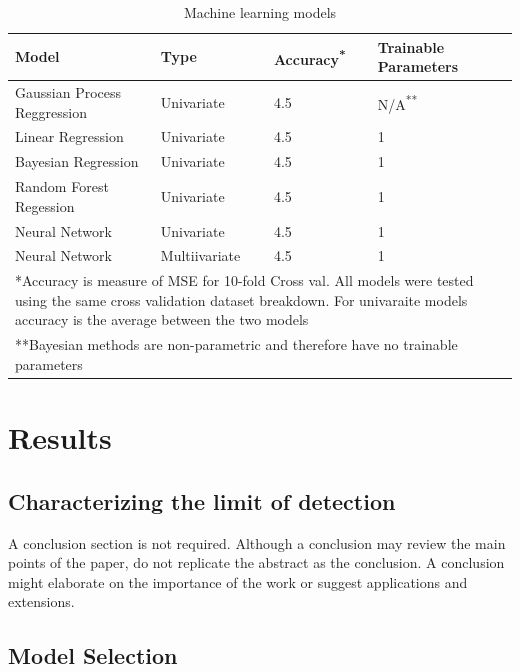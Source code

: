 \documentclass[journal,twoside,web]{ieeecolor}
\begin{document}
\begin{table}
\caption{Machine learning models}
\label{table}
\setlength{\tabcolsep}{3pt}
\begin{tabular}{|p{100pt}|p{45pt}|p{35pt}|p{50pt}|}
\hline
Model & 
Type& 
Accuracy\textsuperscript{*}   &
Trainable Parameters \\
\hline
Gaussian Process Reggression & 
Univariate& 
4.5   &
N/A\textsuperscript{**} \\
Linear Regression  & 
Univariate & 
4.5   &
1 \\
Bayesian Regression & 
Univariate & 
4.5   &
1 \\
Random Forest Regession & 
Univariate & 
4.5   &
1 \\
Neural Network & 
Univariate & 
4.5   &
1 \\
Neural Network & 
Multiivariate & 
4.5   &
1 \\
\hline
\multicolumn{4}{p{251pt}}{*Accuracy is measure of MSE for 10-fold Cross val. All models were tested using the same cross validation dataset breakdown. For univaraite models accuracy is the average between the two models}\\
\multicolumn{4}{p{251pt}}{**Bayesian methods are non-parametric and therefore have no trainable parameters}\\
\end{tabular}
\label{tab1}
\end{table}

\section{Results }


\subsection{Characterizing the limit of detection}

A conclusion section is not required. Although a conclusion may review the 
main points of the paper, do not replicate the abstract as the conclusion. A 
conclusion might elaborate on the importance of the work or suggest 
applications and extensions.

\subsection{Model Selection}
\end{document}
